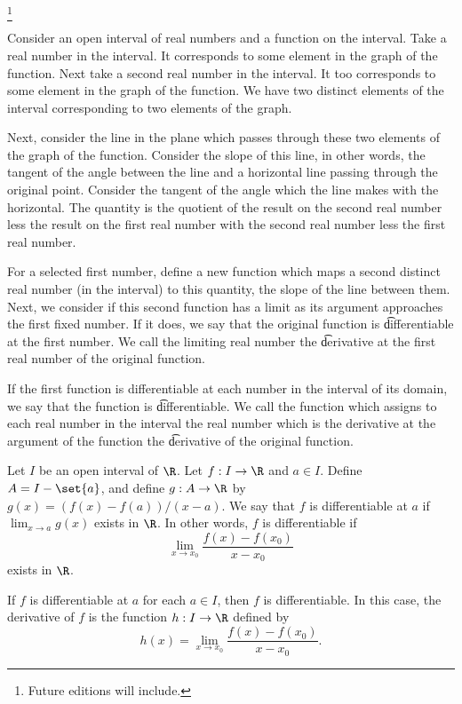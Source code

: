 
\footnote{Future editions will include.}


Consider an open interval of real numbers and a function on the interval.
Take a real number in the interval.  It corresponds to some element in the graph of the function.
Next take a second real number in the interval.
It too corresponds to some element in the graph of the function.
We have two distinct elements of the interval corresponding to two elements of the graph.

Next, consider the line in the plane which passes through these two elements of the graph of the function.
Consider the slope of this line, in other words, the tangent of the angle between the line and a horizontal line passing through the original point.
Consider the tangent of the angle which the line makes with the horizontal.
The quantity is the quotient of the result on the second real number less the result on the first real number with the second real number less the first real number.

For a selected first number, define a new function which maps a second distinct real number (in the interval) to this quantity, the slope of the line between them.
Next, we consider if this second function has a limit as its argument approaches the first fixed number.
If it does, we say that the original function is \t{differentiable at} the first number.  We call the limiting real number the \t{derivative at} the first real number of the original function.

If the first function is differentiable at each number in the interval of its domain, we say that the function is \t{differentiable}.  We call the function which assigns to each real number in the interval the real number which is the derivative at the argument of the function the \t{derivative of} the original function.


Let $I$ be an open interval of $\R$.
Let $f: I \to \R$ and $a \in I$.
Define $A = I - \set{a}$, and define $g: A \to \R$ by $g(x) = (f(x) - f(a))/(x - a)$.
We say that $f$ is differentiable at $a$ if $\lim_{x \to a} g(x)$ exists in $\R$.
In other words, $f$ is differentiable if
\[
  \lim_{x \to x_0}
  \frac{f(x) - f(x_0)}{x - x_0}
\]
exists in $\R$.

If $f$ is differentiable at $a$ for each $a \in I$, then $f$ is differentiable.
In this case, the derivative of $f$ is the function $h: I \to \R$ defined by
\[
  h(x) = \lim_{x \to x_0} \frac{f(x) - f(x_0)}{x - x_0}.
\]
